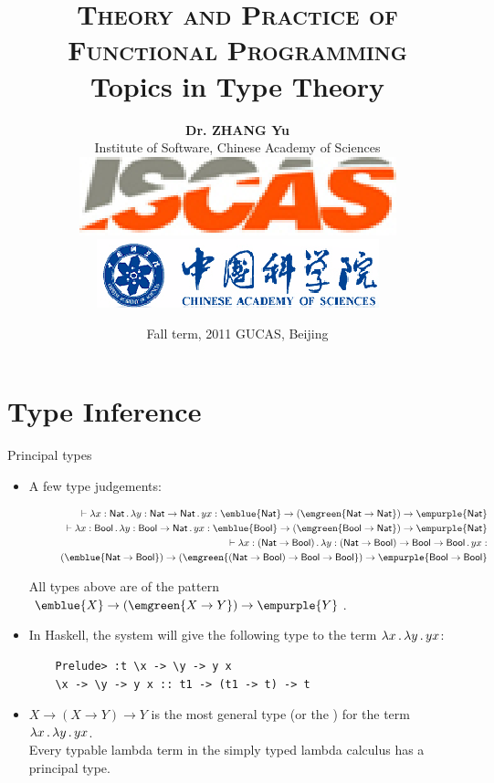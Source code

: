 \documentclass[paper=screen,mode=present,style=zysimple]{powerdot}
\title{{\small \textsc{Theory and Practice of Functional Programming}}
\\[12pt]
{\Large \color{TitleColor} Topics in Type Theory}
}
\author{\small \textbf{Dr. ZHANG Yu}
  \\[2pt] \small Institute of Software, Chinese Academy of Sciences 
  \\[5pt] \includegraphics[height=.04\slideheight]{iscas.eps} 
  \qquad \qquad 
  \includegraphics[height=.04\slideheight]{cas.eps}
}
\date{\scriptsize Fall term, 2011 \qquad GUCAS, Beijing}
\begin{document}
\maketitle 

\section{Type Inference} 

\begin{slide}[method=direct]{Principal types}
\begin{itemize}
\item A few type judgements:
\begin{smalltext}
\begin{eqnarray*} 
&& 
\vdash \lambda x : \tnat \ldot \lambda y : \tnat \to \tnat \ldot y x : 
\emblue{\tnat} \to (\emgreen{\tnat \to \tnat}) \to \empurple{\tnat}
\\ && 
\vdash \lambda x : \tbool \ldot \lambda y : \tbool \to \tnat \ldot y x : 
\emblue{\tbool} \to (\emgreen{\tbool \to \tnat}) \to \empurple{\tnat}
\\ && 
\vdash \lambda x : (\tnat \to \tbool) \ldot \lambda y : (\tnat \to \tbool) \to \tbool \to \tbool \ldot y x : 
\\ && \qquad
(\emblue{\tnat \to \tbool}) \to (\emgreen{(\tnat \to \tbool) \to \tbool \to \tbool}) \to \empurple{\tbool \to \tbool}
\end{eqnarray*}
\end{smalltext}
All types above are of the pattern $\emblue{X} \to (\emgreen{X \to Y}) \to \empurple{Y}$.
\item In Haskell, the system will give the following type to the term $\lambda x \, . \, \lambda y \, . \, y x$:
\vspace*{-1.8em}
\begin{smalltext}
\begin{verbatim}
    Prelude> :t \x -> \y -> y x
    \x -> \y -> y x :: t1 -> (t1 -> t) -> t
\end{verbatim}
\end{smalltext}
\item $X \to (X \to Y) \to Y$ is the most general type (or the ) for the term 
$\lambda x \, . \, \lambda y \, . \, y x$.
\\
Every typable lambda term in the simply typed lambda calculus has a principal type.
\end{itemize}
\end{slide}
\end{document}
